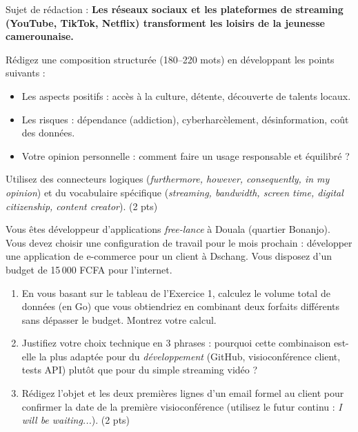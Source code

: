 \documentclass[11pt]{article}
\begin{document}
\begin{exercice}
Sujet de rédaction : \og \textbf{Les réseaux sociaux et les plateformes de streaming (YouTube, TikTok, Netflix) transforment les loisirs de la jeunesse camerounaise.} \fg

Rédigez une composition structurée (180--220 mots) en développant les points suivants :
\begin{itemize}
    \item Les aspects positifs : accès à la culture, détente, découverte de talents locaux.
    \item Les risques : dépendance (addiction), cyberharcèlement, désinformation, coût des données.
    \item Votre opinion personnelle : comment faire un usage responsable et équilibré ?
\end{itemize}
Utilisez des connecteurs logiques (\textit{furthermore, however, consequently, in my opinion}) et du vocabulaire spécifique (\textit{streaming, bandwidth, screen time, digital citizenship, content creator}). \hfill (2 pts)
\end{exercice}

\begin{exercice}
Vous êtes développeur d'applications \textit{free-lance} à Douala (quartier Bonanjo). Vous devez choisir une configuration de travail pour le mois prochain : développer une application de e-commerce pour un client à Dschang. Vous disposez d'un budget de 15\,000 FCFA pour l'internet.

\begin{enumerate}
    \item En vous basant sur le tableau de l'Exercice 1, calculez le volume total de données (en Go) que vous obtiendriez en combinant deux forfaits différents sans dépasser le budget. Montrez votre calcul.
    \item Justifiez votre choix technique en 3 phrases : pourquoi cette combinaison est-elle la plus adaptée pour du \textit{développement} (GitHub, visioconférence client, tests API) plutôt que pour du simple streaming vidéo ?
    \item Rédigez l'objet et les deux premières lignes d'un email formel au client pour confirmer la date de la première visioconférence (utilisez le futur continu : \textit{I will be waiting...}). \hfill (2 pts)
\end{enumerate}
\end{exercice}
\end{document}
